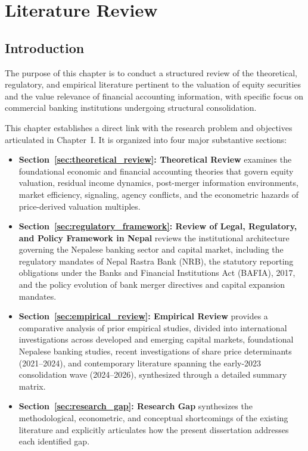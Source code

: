 \chapter{Literature Review}
\label{ch:literature_review}

\section{Introduction}
\label{sec:lit_intro}

The purpose of this chapter is to conduct a structured review of the theoretical, regulatory, and empirical literature pertinent to the valuation of equity securities and the value relevance of financial accounting information, with specific focus on commercial banking institutions undergoing structural consolidation.

This chapter establishes a direct link with the research problem and objectives articulated in Chapter~I. It is organized into four major substantive sections:
\begin{itemize}
\item \textbf{Section~\ref{sec:theoretical_review}: Theoretical Review} examines the foundational economic and financial accounting theories that govern equity valuation, residual income dynamics, post-merger information environments, market efficiency, signaling, agency conflicts, and the econometric hazards of price-derived valuation multiples.
\item \textbf{Section~\ref{sec:regulatory_framework}: Review of Legal, Regulatory, and Policy Framework in Nepal} reviews the institutional architecture governing the Nepalese banking sector and capital market, including the regulatory mandates of Nepal Rastra Bank (NRB), the statutory reporting obligations under the Banks and Financial Institutions Act (BAFIA), 2017, and the policy evolution of bank merger directives and capital expansion mandates.
\item \textbf{Section~\ref{sec:empirical_review}: Empirical Review} provides a comparative analysis of prior empirical studies, divided into international investigations across developed and emerging capital markets, foundational Nepalese banking studies, recent investigations of share price determinants (2021--2024), and contemporary literature spanning the early-2023 consolidation wave (2024--2026), synthesized through a detailed summary matrix.
\item \textbf{Section~\ref{sec:research_gap}: Research Gap} synthesizes the methodological, econometric, and conceptual shortcomings of the existing literature and explicitly articulates how the present dissertation addresses each identified gap.
\end{itemize}

